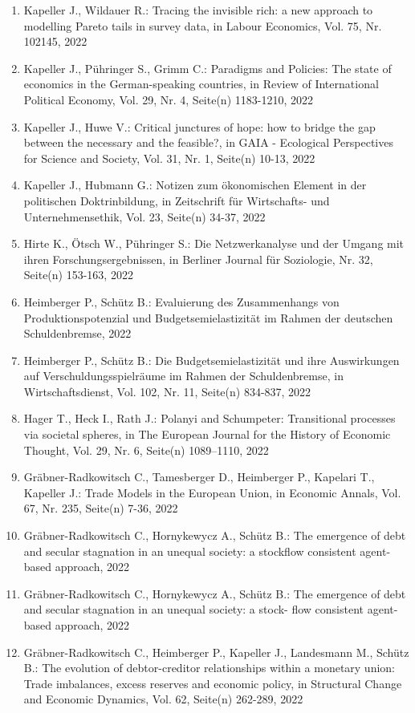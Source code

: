 \begin{enumerate}
	 \item Kapeller J., Wildauer R.: Tracing the invisible rich: a new approach to modelling Pareto tails in survey data, in Labour Economics, Vol. 75, Nr. 102145, 2022
	 \item Kapeller J., Pühringer S., Grimm C.: Paradigms and Policies: The state of economics in the German-speaking countries, in Review of International Political Economy, Vol. 29, Nr. 4, Seite(n) 1183-1210, 2022
	 \item Kapeller J., Huwe V.: Critical junctures of hope: how to bridge the gap between the necessary and the feasible?, in GAIA - Ecological Perspectives for Science and Society, Vol. 31, Nr. 1, Seite(n) 10-13, 2022
	 \item Kapeller J., Hubmann G.: Notizen zum ökonomischen Element in der politischen Doktrinbildung, in Zeitschrift für Wirtschafts- und Unternehmensethik, Vol. 23, Seite(n) 34-37, 2022
	 \item Hirte K., Ötsch W., Pühringer S.: Die Netzwerkanalyse und der Umgang mit ihren Forschungsergebnissen, in Berliner Journal für Soziologie, Nr. 32, Seite(n) 153-163, 2022
	 \item Heimberger P., Schütz B.: Evaluierung des Zusammenhangs von Produktionspotenzial und Budgetsemielastizität im Rahmen der deutschen Schuldenbremse, 2022
	 \item Heimberger P., Schütz B.: Die Budgetsemielastizität und ihre Auswirkungen auf Verschuldungsspielräume im Rahmen der Schuldenbremse, in Wirtschaftsdienst, Vol. 102, Nr. 11, Seite(n) 834-837, 2022
	 \item Hager T., Heck I., Rath J.: Polanyi and Schumpeter: Transitional processes via societal spheres, in The European Journal for the History of Economic Thought, Vol. 29, Nr. 6, Seite(n) 1089–1110, 2022
	 \item Gräbner-Radkowitsch C., Tamesberger D., Heimberger P., Kapelari T., Kapeller J.: Trade Models in the European Union, in Economic Annals, Vol. 67, Nr. 235, Seite(n) 7-36, 2022
	 \item Gräbner-Radkowitsch C., Hornykewycz A., Schütz B.: The emergence of debt and secular stagnation in an unequal society: a stockflow consistent agent-based approach, 2022
	 \item Gräbner-Radkowitsch C., Hornykewycz A., Schütz B.: The emergence of debt and secular stagnation in an unequal society: a stock- flow consistent agent-based approach, 2022
	 \item Gräbner-Radkowitsch C., Heimberger P., Kapeller J., Landesmann M., Schütz B.: The evolution of debtor-creditor relationships within a monetary union: Trade imbalances, excess reserves and economic policy, in Structural Change and Economic Dynamics, Vol. 62, Seite(n) 262-289, 2022

\end{enumerate}
